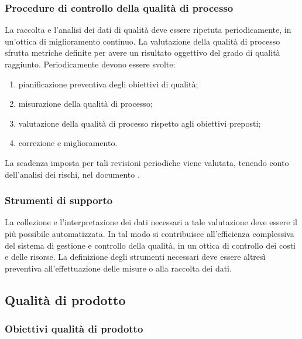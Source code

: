 \documentclass[12pt,a4paper]{article}
\begin{document}
\subsubsection{Procedure di controllo della qualità di processo}
La raccolta e l'analisi dei dati di qualità deve essere ripetuta periodicamente, in un'ottica di miglioramento continuo. La valutazione della qualità di processo sfrutta metriche  definite per avere un risultato oggettivo del grado di qualità raggiunto. Periodicamente devono essere svolte:
\begin{enumerate}
	\item pianificazione preventiva degli obiettivi di qualità;
	\item misurazione della qualità di processo;
	\item valutazione della qualità di processo rispetto agli obiettivi preposti;
	\item correzione e miglioramento.
\end{enumerate}
La scadenza imposta per tali revisioni periodiche viene valutata, tenendo  conto dell'analisi dei rischi, nel documento \PdP{}.

\subsubsection{Strumenti di supporto}
La collezione e l'interpretazione dei dati necessari a tale valutazione deve essere il più possibile automatizzata. In tal modo si contribuisce all'efficienza complessiva del sistema di gestione e controllo della qualità, in un ottica di controllo dei costi e delle risorse. La definizione degli strumenti necessari deve essere altresì preventiva all'effettuazione delle misure o alla raccolta dei dati.

\subsection{Qualità di prodotto}

\subsubsection{Obiettivi qualità di prodotto}
\end{document}
